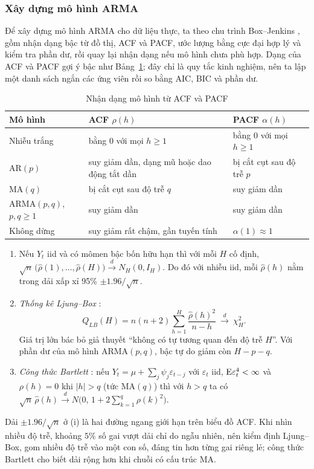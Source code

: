 \subsubsection{Xây dựng mô hình ARMA}

Để xây dựng mô hình ARMA cho dữ liệu thực, ta theo chu trình Box--Jenkins , gồm nhận dạng bậc từ đồ thị, ACF và PACF, ước lượng bằng cực đại hợp lý và kiểm tra phần dư, rồi quay lại nhận dạng nếu mô hình chưa phù hợp. Dạng của ACF và PACF gợi ý bậc như Bảng~\ref{tab:nhandang}; đây chỉ là quy tắc kinh nghiệm, nên ta lập một danh sách ngắn các ứng viên rồi so bằng AIC, BIC và phần dư.

\begin{table}[H]
\centering\small
\caption{Nhận dạng mô hình từ ACF và PACF}\label{tab:nhandang}
\renewcommand{\arraystretch}{1.25}
\begin{tabular}{@{}lll@{}}
\toprule
Mô hình & ACF $\rho(h)$ & PACF $\alpha(h)$ \\
\midrule
Nhiễu trắng & bằng $0$ với mọi $h\ge1$ & bằng $0$ với mọi $h\ge1$ \\
AR$(p)$ & suy giảm dần, dạng mũ hoặc dao động tắt dần & bị cắt cụt sau độ trễ $p$ \\
MA$(q)$ & bị cắt cụt sau độ trễ $q$ & suy giảm dần \\
ARMA$(p,q)$, $p,q\ge1$ & suy giảm dần & suy giảm dần \\
Không dừng & suy giảm rất chậm, gần tuyến tính & $\alpha(1)\approx1$ \\
\bottomrule
\end{tabular}
\end{table}

\begin{kq}
\begin{enumerate}[label=(\roman*),leftmargin=*,itemsep=1pt]
\item Nếu $Y_t$ iid và có mômen bậc bốn hữu hạn thì với mỗi $H$ cố định, $\sqrt n\,\bigl(\hat\rho(1),\dots,\hat\rho(H)\bigr)\xrightarrow{d}N_H(0,I_H)$. Do đó với nhiễu iid, mỗi $\hat\rho(h)$ nằm trong dải xấp xỉ 95\% $\pm1.96/\sqrt n$.
\item \emph{Thống kê Ljung--Box} :
\[
Q_{LB}(H)=n(n+2)\sum_{h=1}^{H}\frac{\hat\rho(h)^2}{n-h}\ \xrightarrow{d}\ \chi^2_H.
\]
Giá trị lớn bác bỏ giả thuyết ``không có tự tương quan đến độ trễ $H$''. Với phần dư của mô hình ARMA$(p,q)$, bậc tự do giảm còn $H-p-q$.
\item \emph{Công thức Bartlett} : nếu $Y_t=\mu+\sum_j\psi_j\varepsilon_{t-j}$ với $\varepsilon_t$ iid, $\mathrm{E}\varepsilon_t^4<\infty$ và $\rho(h)=0$ khi $|h|>q$ (tức MA$(q)$) thì với $h>q$ ta có $\sqrt n\,\hat\rho(h)\xrightarrow{d}N\bigl(0,\,1+2\sum_{k=1}^{q}\rho(k)^2\bigr)$.
\end{enumerate}
\end{kq}
Dải $\pm1.96/\sqrt n$ ở (i) là hai đường ngang giới hạn trên biểu đồ ACF. Khi nhìn nhiều độ trễ, khoảng $5\%$ số gai vượt dải chỉ do ngẫu nhiên, nên kiểm định Ljung--Box, gom nhiều độ trễ vào một con số, đáng tin hơn từng gai riêng lẻ; công thức Bartlett cho biết dải rộng hơn khi chuỗi có cấu trúc MA.

